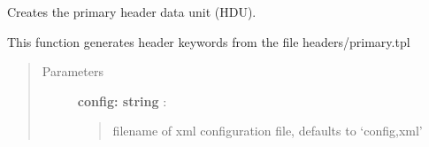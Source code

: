 \documentclass[letterpaper,10pt,english]{sphinxmanual}
\begin{document}

\begin{fulllineitems}
\label{index:pyFitsidi.make_primary}
Creates the primary header data unit (HDU).

This function generates header keywords from the file headers/primary.tpl
\begin{quote}\begin{description}
\item[{Parameters }] \leavevmode
\textbf{config: string} :
\begin{quote}

filename of xml configuration file, defaults to `config,xml'
\end{quote}

\end{description}\end{quote}

\end{fulllineitems}


\end{document}
